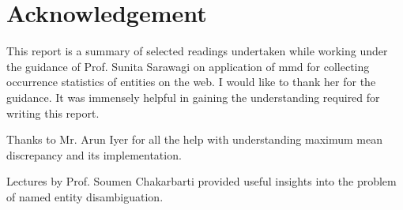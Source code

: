 \section{Acknowledgement}
This report is a summary of selected readings undertaken while working under the guidance 
of Prof. Sunita Sarawagi on application of mmd for collecting occurrence statistics 
of entities on the web. I would like to thank her for the guidance. 
It was immensely helpful in gaining the understanding 
required for writing this report.

Thanks to Mr. Arun Iyer for all the help with understanding maximum mean discrepancy and its implementation.

Lectures by Prof. Soumen Chakarbarti provided useful insights into the problem of named entity disambiguation.

